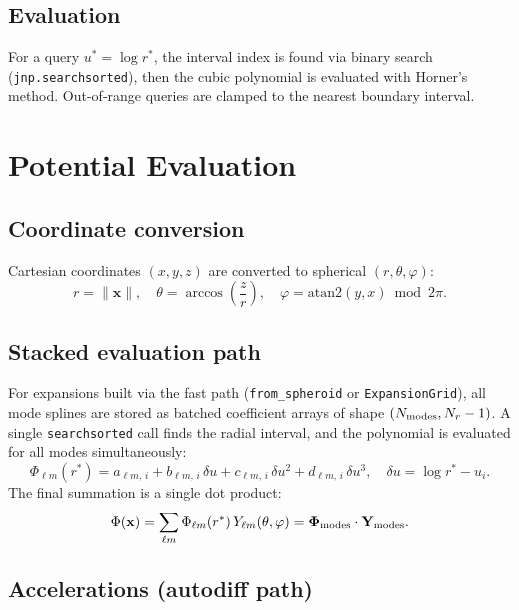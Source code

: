 \documentclass[11pt]{article}
\begin{document}
\subsection{Evaluation}

For a query $u^* = \log r^*$, the interval index is found via binary search
(\texttt{jnp.searchsorted}), then the cubic polynomial is evaluated with
Horner's method.  Out-of-range queries are clamped to the nearest boundary
interval.

\section{Potential Evaluation}

\subsection{Coordinate conversion}

Cartesian coordinates $(x,y,z)$ are converted to spherical $(r,\theta,\varphi)$:
\begin{equation}
  r = \|\mathbf{x}\|, \quad
  \theta = \arccos\!\left(\frac{z}{r}\right), \quad
  \varphi = \mathrm{atan2}(y,x) \bmod 2\pi.
\end{equation}

\subsection{Stacked evaluation path}

For expansions built via the fast path (\texttt{from\_spheroid} or
\texttt{ExpansionGrid}), all mode splines are stored as batched coefficient
arrays of shape $(N_{\rm modes}, N_r - 1)$.  A single \texttt{searchsorted}
call finds the radial interval, and the polynomial is evaluated for all modes
simultaneously:
\begin{equation}
  \Phi_{\ell m}(r^*) = a_{\ell m,\,i}
  + b_{\ell m,\,i}\,\delta u
  + c_{\ell m,\,i}\,\delta u^2
  + d_{\ell m,\,i}\,\delta u^3,
  \quad \delta u = \log r^* - u_i.
\end{equation}
The final summation is a single dot product:
\begin{equation}
  \Phi(\mathbf{x}) = \sum_{\ell m} \Phi_{\ell m}(r^*)\, Y_{\ell m}(\theta,\varphi)
  = \mathbf{\Phi}_{\rm modes} \cdot \mathbf{Y}_{\rm modes}.
\end{equation}

\subsection{Accelerations (autodiff path)}
\end{document}
